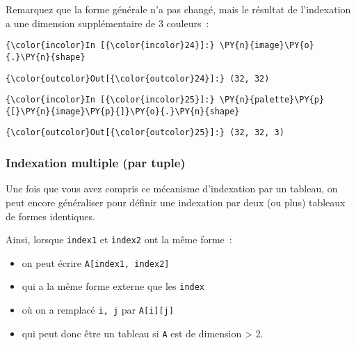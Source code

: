     Remarquez que la forme générale n'a pas changé, mais le résultat de
l'indexation a une dimension supplémentaire de 3 couleurs~:

    \begin{Verbatim}[commandchars=\\\{\},frame=single,framerule=0.3mm,rulecolor=\color{cellframecolor}]
{\color{incolor}In [{\color{incolor}24}]:} \PY{n}{image}\PY{o}{.}\PY{n}{shape}
\end{Verbatim}


\begin{Verbatim}[commandchars=\\\{\},frame=single,framerule=0.3mm,rulecolor=\color{cellframecolor}]
{\color{outcolor}Out[{\color{outcolor}24}]:} (32, 32)
\end{Verbatim}
            
    \begin{Verbatim}[commandchars=\\\{\},frame=single,framerule=0.3mm,rulecolor=\color{cellframecolor}]
{\color{incolor}In [{\color{incolor}25}]:} \PY{n}{palette}\PY{p}{[}\PY{n}{image}\PY{p}{]}\PY{o}{.}\PY{n}{shape}
\end{Verbatim}


\begin{Verbatim}[commandchars=\\\{\},frame=single,framerule=0.3mm,rulecolor=\color{cellframecolor}]
{\color{outcolor}Out[{\color{outcolor}25}]:} (32, 32, 3)
\end{Verbatim}
            
    \hypertarget{indexation-multiple-par-tuple}{%
\subsubsection{Indexation multiple (par
tuple)}\label{indexation-multiple-par-tuple}}

    Une fois que vous avez compris ce mécanisme d'indexation par un tableau,
on peut encore généraliser pour définir une indexation par deux (ou
plus) tableaux de formes identiques.

    Ainsi, lorsque \texttt{index1} et \texttt{index2} ont la même forme~:

\begin{itemize}
\tightlist
\item
  on peut écrire \texttt{A{[}index1,\ index2{]}}
\item
  qui a la même forme externe que les \texttt{index}
\item
  où on a remplacé \texttt{i,\ j} par \texttt{A{[}i{]}{[}j{]}}
\item
  qui peut donc être un tableau si \texttt{A} est de dimension
  \textgreater{} 2.
\end{itemize}

